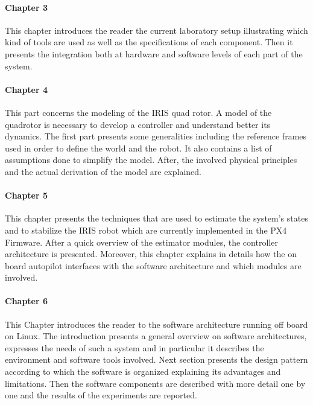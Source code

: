 \paragraph{Chapter 3}

This chapter introduces the reader the current laboratory setup illustrating which kind of tools are used as well as the specifications of each component. Then it presents the integration both at hardware and software levels of each part of the system. 

\paragraph{Chapter 4}
This part concerns the modeling of the IRIS quad rotor. A model of the quadrotor is necessary to develop a controller and understand better its dynamics. The first part presents some generalities including the reference frames used in order to define the world and the robot. It also contains a list of assumptions done to simplify the model. After, the involved physical principles and the actual derivation of the model are explained.

\paragraph{Chapter 5}

This chapter presents the techniques that are used to estimate the system's states and to stabilize the IRIS robot which are currently implemented in the PX4 Firmware. After a quick overview of the estimator modules, the controller architecture is presented. Moreover, this chapter explains in details how the on board autopilot interfaces with the software architecture and which modules are involved.

\paragraph{Chapter 6}

This Chapter introduces the reader to the software architecture running off board on Linux. The introduction presents a  general overview on software architectures, expresses the needs of such a system and in particular it describes the environment and software tools involved. Next section presents the design pattern according to which the software is organized explaining its advantages and limitations. Then the software components are described with more detail one by one and the results of the experiments are reported. 


